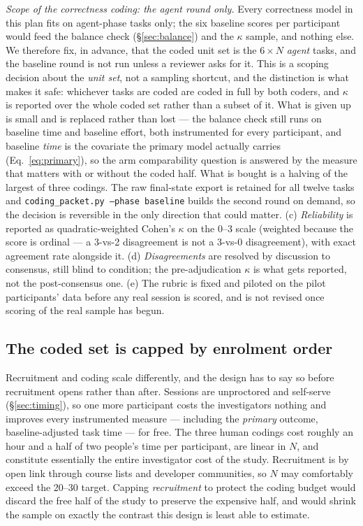 \documentclass[11pt]{article}
\newcommand{\code}[1]{\texttt{#1}}
\begin{document}
\emph{Scope of the correctness coding: the agent round only.}\label{sec:correctness-scope} Every correctness
model in this plan fits on agent-phase tasks only; the six baseline scores per
participant would feed the balance check (\S\ref{sec:balance}) and the $\kappa$
sample, and nothing else. We therefore fix, in advance, that the coded unit set
is the $6\times N$ \emph{agent} tasks, and the baseline round is not run unless a
reviewer asks for it. This is a scoping decision about the \emph{unit set}, not a
sampling shortcut, and the distinction is what makes it safe: whichever tasks are
coded are coded in full by both coders, and $\kappa$ is reported over the whole
coded set rather than a subset of it. What is given up is small and is replaced
rather than lost --- the balance check still runs on baseline time and baseline
effort, both instrumented for every participant, and baseline \emph{time} is the
covariate the primary model actually carries (Eq.~\eqref{eq:primary}), so the arm
comparability question is answered by the measure that matters with or without
the coded half. What is bought is a halving of the largest of three codings. The
raw final-state export is retained for all twelve tasks and
\code{coding\_packet.py --phase baseline} builds the second round on demand, so
the decision is reversible in the only direction that could matter. (c) \emph{Reliability} is reported as quadratic-weighted
Cohen's $\kappa$ on the 0--3 scale (weighted because the score is ordinal --- a
3-vs-2 disagreement is not a 3-vs-0 disagreement), with exact agreement rate
alongside it. (d) \emph{Disagreements} are resolved by discussion to consensus,
still blind to condition; the pre-adjudication $\kappa$ is what gets reported,
not the post-consensus one. (e) The rubric is fixed and piloted on the pilot
participants' data before any real session is scored, and is not revised once
scoring of the real sample has begun.

\subsection{The coded set is capped by enrolment order}\label{sec:cap}

Recruitment and coding scale differently, and the design has to say so before
recruitment opens rather than after. Sessions are unproctored and self-serve
(\S\ref{sec:timing}), so one more participant costs the investigators nothing and
improves every instrumented measure --- including the \emph{primary} outcome,
baseline-adjusted task time --- for free. The three human codings cost roughly an
hour and a half of two people's time per participant, are linear in $N$, and
constitute essentially the entire investigator cost of the study. Recruitment is
by open link through course lists and developer communities, so $N$ may
comfortably exceed the 20--30 target. Capping \emph{recruitment} to protect the
coding budget would discard the free half of the study to preserve the expensive
half, and would shrink the sample on exactly the contrast this design is least
able to estimate.
\end{document}
